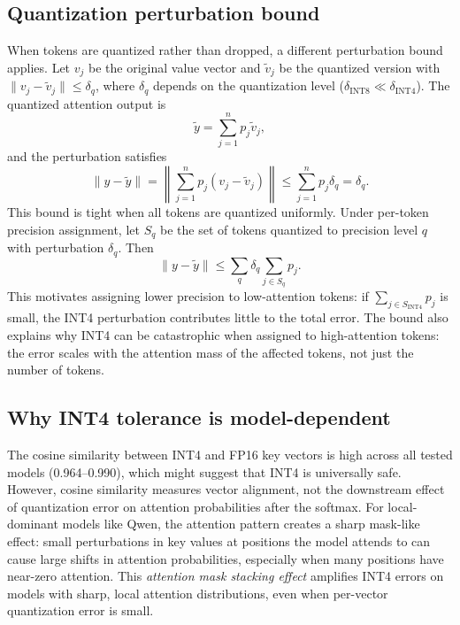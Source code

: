 \documentclass[11pt]{article}
\theoremstyle{definition}
\theoremstyle{plain}
\begin{document}
\subsection{Quantization perturbation bound}
When tokens are quantized rather than dropped, a different perturbation bound applies.  Let $v_j$ be the original value vector and $\tilde{v}_j$ be the quantized version with $\|v_j - \tilde{v}_j\| \le \delta_q$, where $\delta_q$ depends on the quantization level ($\delta_{\text{INT8}} \ll \delta_{\text{INT4}}$).  The quantized attention output is
\begin{equation}
  \tilde{y} = \sum_{j=1}^{n} p_j \tilde{v}_j,
\end{equation}
and the perturbation satisfies
\begin{equation}
  \|y - \tilde{y}\| = \left\|\sum_{j=1}^{n} p_j (v_j - \tilde{v}_j)\right\| \le \sum_{j=1}^{n} p_j \delta_q = \delta_q.
\end{equation}
This bound is tight when all tokens are quantized uniformly.  Under per-token precision assignment, let $S_q$ be the set of tokens quantized to precision level $q$ with perturbation $\delta_q$.  Then
\begin{equation}
  \|y - \tilde{y}\| \le \sum_{q} \delta_q \sum_{j \in S_q} p_j.
\end{equation}
This motivates assigning lower precision to low-attention tokens: if $\sum_{j \in S_{\text{INT4}}} p_j$ is small, the INT4 perturbation contributes little to the total error.  The bound also explains why INT4 can be catastrophic when assigned to high-attention tokens: the error scales with the attention mass of the affected tokens, not just the number of tokens.

\subsection{Why INT4 tolerance is model-dependent}
The cosine similarity between INT4 and FP16 key vectors is high across all tested models (0.964--0.990), which might suggest that INT4 is universally safe.  However, cosine similarity measures vector alignment, not the downstream effect of quantization error on attention probabilities after the softmax.  For local-dominant models like Qwen, the attention pattern creates a sharp mask-like effect: small perturbations in key values at positions the model attends to can cause large shifts in attention probabilities, especially when many positions have near-zero attention.  This \emph{attention mask stacking effect} amplifies INT4 errors on models with sharp, local attention distributions, even when per-vector quantization error is small.
\end{document}
